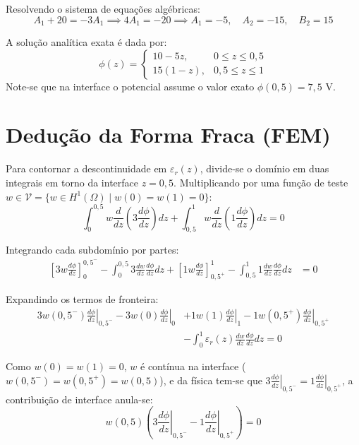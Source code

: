 \documentclass[12pt,a4paper]{article}
\begin{document}
Resolvendo o sistema de equações algébricas:
\begin{equation}
    A_1 + 20 = -3A_1 \implies 4A_1 = -20 \implies A_1 = -5, \quad A_2 = -15, \quad B_2 = 15
\end{equation}

A solução analítica exata é dada por:
\begin{equation}
    \phi(z) = \begin{cases} 
        10 - 5z, & 0 \le z \le 0{,}5 \\ 
        15(1 - z), & 0{,}5 \le z \le 1 
    \end{cases}
\end{equation}
Note-se que na interface o potencial assume o valor exato $\phi(0{,}5) = 7{,}5\text{ V}$.

\section{Dedução da Forma Fraca (FEM)}
Para contornar a descontinuidade em $\varepsilon_r(z)$, divide-se o domínio em duas integrais em torno da interface $z = 0{,}5$. Multiplicando por uma função de teste $w \in \mathcal{V} = \{ w \in H^1(\Omega) \mid w(0) = w(1) = 0 \}$:
\begin{equation}
    \int_0^{0{,}5} w \frac{d}{dz}\left(3 \frac{d\phi}{dz}\right) dz + \int_{0{,}5}^1 w \frac{d}{dz}\left(1 \frac{d\phi}{dz}\right) dz = 0
\end{equation}

Integrando cada subdomínio por partes:
\begin{align}
    \left[ 3 w \frac{d\phi}{dz} \right]_0^{0{,}5^-} - \int_0^{0{,}5} 3 \frac{dw}{dz}\frac{d\phi}{dz} dz + \left[ 1 w \frac{d\phi}{dz} \right]_{0{,}5^+}^1 - \int_{0{,}5}^1 1 \frac{dw}{dz}\frac{d\phi}{dz} dz &= 0
\end{align}

Expandindo os termos de fronteira:
\begin{align}
    3 w(0{,}5^-)\left.\frac{d\phi}{dz}\right|_{0{,}5^-} - 3 w(0)\left.\frac{d\phi}{dz}\right|_0 &+ 1 w(1)\left.\frac{d\phi}{dz}\right|_1 - 1 w(0{,}5^+)\left.\frac{d\phi}{dz}\right|_{0{,}5^+} \nonumber \\
    &- \int_0^1 \varepsilon_r(z)\frac{dw}{dz}\frac{d\phi}{dz} dz = 0
\end{align}

Como $w(0) = w(1) = 0$, $w$ é contínua na interface ($w(0{,}5^-) = w(0{,}5^+) = w(0{,}5)$), e da física tem-se que $3\left.\frac{d\phi}{dz}\right|_{0{,}5^-} = 1\left.\frac{d\phi}{dz}\right|_{0{,}5^+}$, a contribuição de interface anula-se:
\begin{equation}
    w(0{,}5) \left( 3\left.\frac{d\phi}{dz}\right|_{0{,}5^-} - 1\left.\frac{d\phi}{dz}\right|_{0{,}5^+} \right) = 0
\end{equation}
\end{document}
